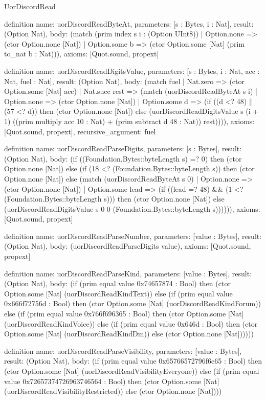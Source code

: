 \begin{lexlean}{UorDiscordRead}
\begin{semanticmodule}
definition{
  name: uorDiscordReadByteAt,
  parameters: [s : Bytes, i : Nat],
  result: (Option Nat),
  body: (match (prim index s i : (Option UInt8))
    | Option.none => (ctor Option.none [Nat])
    | Option.some b => (ctor Option.some [Nat] (prim to_nat b : Nat))),
  axioms: [Quot.sound, propext]
}

definition{
  name: uorDiscordReadDigitsValue,
  parameters: [s : Bytes, i : Nat, acc : Nat, fuel : Nat],
  result: (Option Nat),
  body: (match fuel
    | Nat.zero => (ctor Option.some [Nat] acc)
    | Nat.succ rest => (match (uorDiscordReadByteAt s i)
      | Option.none => (ctor Option.none [Nat])
      | Option.some d => (if ((d <? 48) || (57 <? d)) then (ctor Option.none [Nat]) else (uorDiscordReadDigitsValue s (i + 1) ((prim multiply acc 10 : Nat) + (prim subtract d 48 : Nat)) rest)))),
  axioms: [Quot.sound, propext],
  recursive_argument: fuel
}

definition{
  name: uorDiscordReadParseDigits,
  parameters: [s : Bytes],
  result: (Option Nat),
  body: (if ((Foundation.Bytes::byteLength s) =? 0) then (ctor Option.none [Nat]) else (if (18 <? (Foundation.Bytes::byteLength s)) then (ctor Option.none [Nat]) else (match (uorDiscordReadByteAt s 0)
    | Option.none => (ctor Option.none [Nat])
    | Option.some lead => (if ((lead =? 48) && (1 <? (Foundation.Bytes::byteLength s))) then (ctor Option.none [Nat]) else (uorDiscordReadDigitsValue s 0 0 (Foundation.Bytes::byteLength s)))))),
  axioms: [Quot.sound, propext]
}

definition{
  name: uorDiscordReadParseNumber,
  parameters: [value : Bytes],
  result: (Option Nat),
  body: (uorDiscordReadParseDigits value),
  axioms: [Quot.sound, propext]
}

definition{
  name: uorDiscordReadParseKind,
  parameters: [value : Bytes],
  result: (Option Nat),
  body: (if (prim equal value 0x74657874 : Bool) then (ctor Option.some [Nat] (uorDiscordReadKindText)) else (if (prim equal value 0x666f72756d : Bool) then (ctor Option.some [Nat] (uorDiscordReadKindForum)) else (if (prim equal value 0x766f696365 : Bool) then (ctor Option.some [Nat] (uorDiscordReadKindVoice)) else (if (prim equal value 0x646d : Bool) then (ctor Option.some [Nat] (uorDiscordReadKindDm)) else (ctor Option.none [Nat])))))
}

definition{
  name: uorDiscordReadParseVisibility,
  parameters: [value : Bytes],
  result: (Option Nat),
  body: (if (prim equal value 0x65766572796f6e65 : Bool) then (ctor Option.some [Nat] (uorDiscordReadVisibilityEveryone)) else (if (prim equal value 0x72657374726963746564 : Bool) then (ctor Option.some [Nat] (uorDiscordReadVisibilityRestricted)) else (ctor Option.none [Nat])))
}


\end{semanticmodule}
\end{lexlean}
